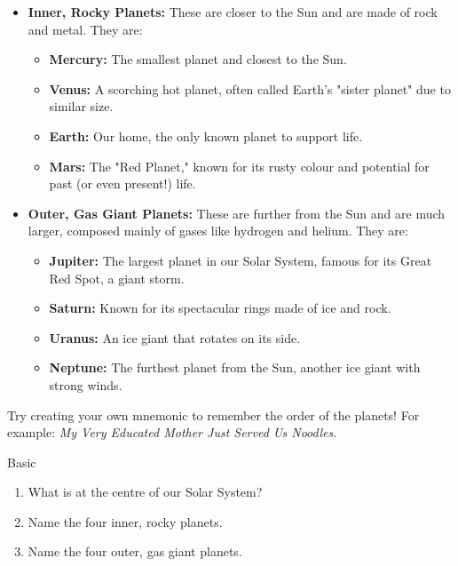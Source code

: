 \begin{itemize}
    \item \textbf{Inner, Rocky Planets:} These are closer to the Sun and are made of rock and metal. They are:
        \begin{itemize}
            \item \textbf{Mercury:} The smallest planet and closest to the Sun.
            \item \textbf{Venus:}  A scorching hot planet, often called Earth's "sister planet" due to similar size.
            \item \textbf{Earth:} Our home, the only known planet to support life.
            \item \textbf{Mars:} The "Red Planet," known for its rusty colour and potential for past (or even present!) life.
        \end{itemize}
    \item \textbf{Outer, Gas Giant Planets:}  These are further from the Sun and are much larger, composed mainly of gases like hydrogen and helium. They are:
        \begin{itemize}
            \item \textbf{Jupiter:} The largest planet in our Solar System, famous for its Great Red Spot, a giant storm.
            \item \textbf{Saturn:} Known for its spectacular rings made of ice and rock.
            \item \textbf{Uranus:} An ice giant that rotates on its side.
            \item \textbf{Neptune:} The furthest planet from the Sun, another ice giant with strong winds.
        \end{itemize}
\end{itemize}

\begin{marginnote}
Try creating your own mnemonic to remember the order of the planets! For example: \textit{My Very Educated Mother Just Served Us Noodles}.
\end{marginnote}

\begin{tieredquestions}{Basic}
\begin{enumerate}
    \item What is at the centre of our Solar System?
    \item Name the four inner, rocky planets.
    \item Name the four outer, gas giant planets.
\end{enumerate}
\end{tieredquestions}

